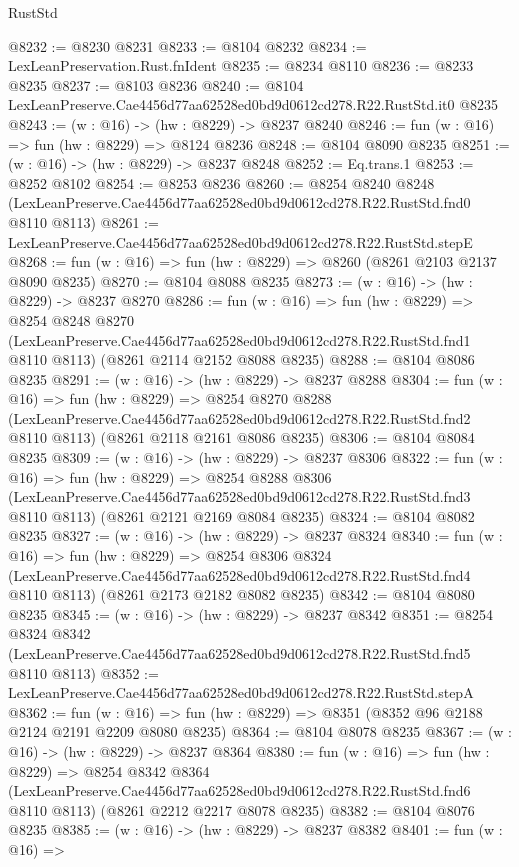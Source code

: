 \begin{lexlean}{RustStd}
\begin{coremodule}
@8232 := @8230 @8231
@8233 := @8104 @8232
@8234 := LexLeanPreservation.Rust.fnIdent
@8235 := @8234 @8110
@8236 := @8233 @8235
@8237 := @8103 @8236
@8240 := @8104 LexLeanPreserve.Cae4456d77aa62528ed0bd9d0612cd278.R22.RustStd.it0 @8235
@8243 := (w : @16) -> (hw : @8229) -> @8237 @8240
@8246 := fun (w : @16) => fun (hw : @8229) => @8124 @8236
@8248 := @8104 @8090 @8235
@8251 := (w : @16) -> (hw : @8229) -> @8237 @8248
@8252 := Eq.trans.{1}
@8253 := @8252 @8102
@8254 := @8253 @8236
@8260 := @8254
    @8240
    @8248
    (LexLeanPreserve.Cae4456d77aa62528ed0bd9d0612cd278.R22.RustStd.fnd0 @8110 @8113)
@8261 := LexLeanPreserve.Cae4456d77aa62528ed0bd9d0612cd278.R22.RustStd.stepE
@8268 := fun (w : @16) => fun (hw : @8229) => @8260 (@8261 @2103 @2137 @8090 @8235)
@8270 := @8104 @8088 @8235
@8273 := (w : @16) -> (hw : @8229) -> @8237 @8270
@8286 := fun (w : @16) =>
  fun (hw : @8229) =>
  @8254
    @8248
    @8270
    (LexLeanPreserve.Cae4456d77aa62528ed0bd9d0612cd278.R22.RustStd.fnd1 @8110 @8113)
    (@8261 @2114 @2152 @8088 @8235)
@8288 := @8104 @8086 @8235
@8291 := (w : @16) -> (hw : @8229) -> @8237 @8288
@8304 := fun (w : @16) =>
  fun (hw : @8229) =>
  @8254
    @8270
    @8288
    (LexLeanPreserve.Cae4456d77aa62528ed0bd9d0612cd278.R22.RustStd.fnd2 @8110 @8113)
    (@8261 @2118 @2161 @8086 @8235)
@8306 := @8104 @8084 @8235
@8309 := (w : @16) -> (hw : @8229) -> @8237 @8306
@8322 := fun (w : @16) =>
  fun (hw : @8229) =>
  @8254
    @8288
    @8306
    (LexLeanPreserve.Cae4456d77aa62528ed0bd9d0612cd278.R22.RustStd.fnd3 @8110 @8113)
    (@8261 @2121 @2169 @8084 @8235)
@8324 := @8104 @8082 @8235
@8327 := (w : @16) -> (hw : @8229) -> @8237 @8324
@8340 := fun (w : @16) =>
  fun (hw : @8229) =>
  @8254
    @8306
    @8324
    (LexLeanPreserve.Cae4456d77aa62528ed0bd9d0612cd278.R22.RustStd.fnd4 @8110 @8113)
    (@8261 @2173 @2182 @8082 @8235)
@8342 := @8104 @8080 @8235
@8345 := (w : @16) -> (hw : @8229) -> @8237 @8342
@8351 := @8254
    @8324
    @8342
    (LexLeanPreserve.Cae4456d77aa62528ed0bd9d0612cd278.R22.RustStd.fnd5 @8110 @8113)
@8352 := LexLeanPreserve.Cae4456d77aa62528ed0bd9d0612cd278.R22.RustStd.stepA
@8362 := fun (w : @16) => fun (hw : @8229) => @8351 (@8352 @96 @2188 @2124 @2191 @2209 @8080 @8235)
@8364 := @8104 @8078 @8235
@8367 := (w : @16) -> (hw : @8229) -> @8237 @8364
@8380 := fun (w : @16) =>
  fun (hw : @8229) =>
  @8254
    @8342
    @8364
    (LexLeanPreserve.Cae4456d77aa62528ed0bd9d0612cd278.R22.RustStd.fnd6 @8110 @8113)
    (@8261 @2212 @2217 @8078 @8235)
@8382 := @8104 @8076 @8235
@8385 := (w : @16) -> (hw : @8229) -> @8237 @8382
@8401 := fun (w : @16) =>

\end{coremodule}
\end{lexlean}
